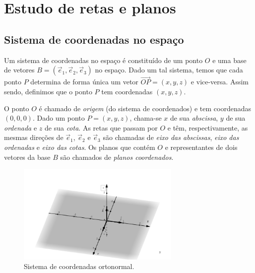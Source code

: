 
\chapter{Estudo de retas e planos}\label{cap_erp}
\thispagestyle{fancy}

\section{Sistema de coordenadas no espaço}\label{cap_erp_sec_siscoord}

Um sistema de coordenadas no espaço é constituído de um ponto $O$ e uma base de vetores $B = (\vec{e}_1, \vec{e}_2, \vec{e}_3)$ no espaço. Dado um tal sistema, temos que cada ponto $P$ determina de forma única um vetor $\overrightarrow{OP} = (x,y,z)$ e vice-versa. Assim sendo, definimos que o ponto $P$ tem coordenadas $(x,y,z)$.

O ponto $O$ é chamado de \emph{origem} (do sistema de coordenados) e tem coordenadas $(0,0,0)$. Dado um ponto $P=(x,y,z)$, chama-se $x$ de sua \emph{abscissa}, $y$ de sua \emph{ordenada} e $z$ de sua \emph{cota}. As retas que passam por $O$ e têm, respectivamente, as mesmas direções de $\vec{e}_1$, $\vec{e}_2$ e $\vec{e}_3$ são chamadas de \emph{eixo das abscissas}, \emph{eixo das ordenadas} e \emph{eixo das cotas}. Os planos que contém $O$ e representantes de dois vetores da base $B$ são chamados de \emph{planos coordenados}.

\begin{figure}[H]
  \centering
  \includegraphics[width=0.7\textwidth]{./cap_erp/dados/fig_sis_coord_orto/fig_sis_coord_orto}
  \caption{Sistema de coordenadas ortonormal.}
  \label{fig:sis_coord_orto}
\end{figure}

